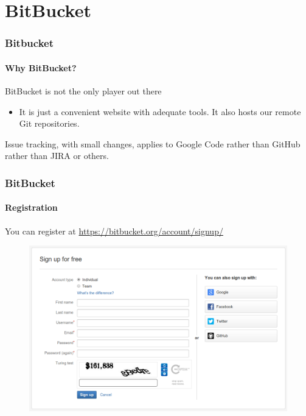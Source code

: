 \section{BitBucket}

\begin{frame}
\frametitle{Bitbucket}
\framesubtitle{Why BitBucket?}

\begin{block}{BitBucket is not the only player out there}
\begin{itemize}
\item It is just a convenient website with adequate tools. It also hosts our remote Git repositories.
\end{itemize}
Issue tracking, with small changes, applies to Google Code rather than GitHub rather than JIRA or others. 
\end{block}

\end{frame}

\begin{frame}
\frametitle{BitBucket}
\framesubtitle{Registration}

\medskip

You can register at \url{https://bitbucket.org/account/signup/}

\begin{figure}
\includegraphics[width=1.0\textwidth]{lecture04/img/createnewaccount.png}
\end{figure}

\end{frame}

